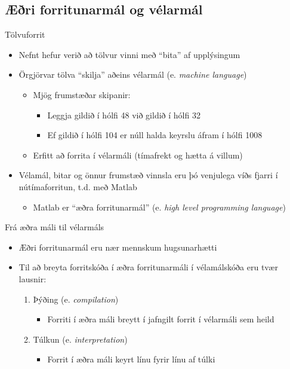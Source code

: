 \documentclass{beamer}
\begin{document}
\subsection{Æðri forritunarmál og vélarmál}
\begin{frame}{Tölvuforrit}
 \begin{itemize}
  \item Nefnt hefur verið að tölvur vinni með ``bita'' af upplýsingum
  \item Örgjörvar tölva ``skilja'' aðeins vélarmál (e. \emph{machine language})
  \begin{itemize}
   \item Mjög frumstæðar skipanir:
   \begin{itemize}
    \item Leggja gildið í hólfi 48 við gildið í hólfi 32
    \item Ef gildið í hólfi 104 er núll halda keyrslu áfram í hólfi 1008
   \end{itemize}
   \item Erfitt að forrita í vélarmáli (tímafrekt og hætta á villum)
  \end{itemize}
    \item Vélamál, bitar og önnur frumstæð vinnsla eru þó venjulega víðs fjarri í nútímaforritun, t.d. með Matlab
  \begin{itemize}
   \item Matlab er ``æðra forritunarmál'' (e. \emph{high level programming language})
  \end{itemize}
 \end{itemize}
\end{frame}

\begin{frame}{Frá æðra máli til vélarmáls}
\begin{itemize}
 \item Æðri forritunarmál eru nær mennskum hugsunarhætti
 \item Til að breyta forritskóða í æðra forritunarmáli í vélamálskóða eru tvær lausnir:
 \begin{enumerate}
  \item Þýðing (e. \emph{compilation})
  \begin{itemize}
   \item Forriti í æðra máli breytt í jafngilt forrit í vélarmáli sem heild
  \end{itemize}
  \item Túlkun (e. \emph{interpretation})
  \begin{itemize}
   \item Forrit í æðra máli keyrt línu fyrir línu af túlki
  \end{itemize}
 \end{enumerate}
\end{itemize}
\end{frame}
\end{document}
